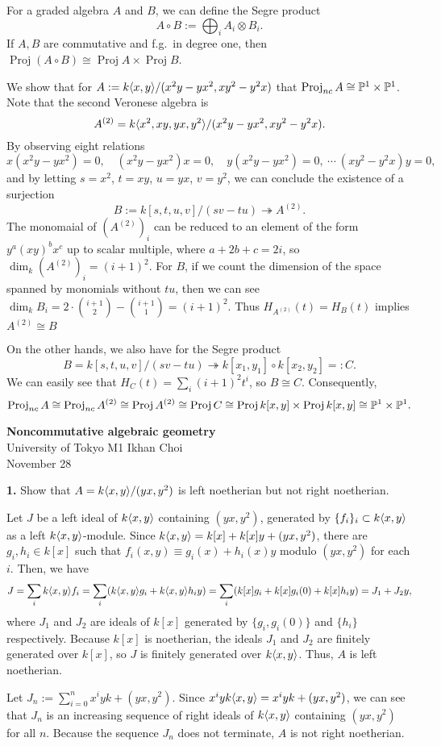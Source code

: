 \documentclass{../../../small}
\newcommand{\Proj}{\operatorname{Proj}}
\begin{document}
For a graded algebra $A$ and $B$, we can define the Segre product
\[A\circ B:=\bigoplus_iA_i\otimes B_i.\]
If $A,B$ are commutative and f.g.~in degree one, then $\Proj(A\circ B)\cong\Proj A\times\Proj B$.



\begin{ex}
We show that for $A:=k\langle x,y\rangle/(x^2y-yx^2,xy^2-y^2x)$ that $\Proj_{nc}A\cong\P^1\times\P^1$.
Note that the second Veronese algebra is
\[A^{(2)}=k\langle x^2,xy,yx,y^2\rangle/(x^2y-yx^2,xy^2-y^2x).\]
By observing eight relations
\[x(x^2y-yx^2)=0,\quad(x^2y-yx^2)x=0,\quad y(x^2y-yx^2)=0,\ \cdots\ (xy^2-y^2x)y=0,\]
and by letting $s=x^2$, $t=xy$, $u=yx$, $v=y^2$, we can conclude the existence of a surjection
\[B:=k[s,t,u,v]/(sv-tu)\twoheadrightarrow A^{(2)}.\]
The monomaial of $(A^{(2)})_i$ can be reduced to an element of the form $y^a(xy)^bx^c$ up to scalar multiple, where $a+2b+c=2i$, so $\dim_k(A^{(2)})_i=(i+1)^2$.
For $B$, if we count the dimension of the space spanned by monomials without $tu$, then we can see $\dim_kB_i=2\cdot{i+1\choose2}-{i+1\choose1}=(i+1)^2$.
Thus $H_{A^{(2)}}(t)=H_B(t)$ implies $A^{(2)}\cong B$

On the other hands, we also have for the Segre product
\[B=k[s,t,u,v]/(sv-tu)\twoheadrightarrow k[x_1,y_1]\circ k[x_2,y_2]=:C.\]
We can easily see that $H_C(t)=\sum_i(i+1)^2t^i$, so $B\cong C$.
Consequently,
\[\Proj_{nc}A\cong\Proj_{nc}A^{(2)}\cong\Proj A^{(2)}\cong\Proj C\cong\Proj k[x,y]\times\Proj k[x,y]\cong\P^1\times\P^1.\]
\end{ex}


\newpage
{}
\begin{center}
{\large\textbf{Noncommutative algebraic geometry}}\\
\bigskip
University of Tokyo M1 Ikhan Choi\\
November 28
\end{center}

\noindent
\textbf{1.}
Show that $A=k\langle x,y\rangle/(yx,y^2)$ is left noetherian but not right noetherian.
\begin{sol}
Let $J$ be a left ideal of $k\langle x,y\rangle$ containing $(yx,y^2)$, generated by $\{f_i\}_i\subset k\langle x,y\rangle$ as a left $k\langle x,y\rangle$-module.
Since $k\langle x,y\rangle=k[x]+k[x]y+(yx,y^2)$, there are $g_i,h_i\in k[x]$ such that $f_i(x,y)\equiv g_i(x)+h_i(x)y$ modulo $(yx,y^2)$ for each $i$.
Then, we have
\[J=\sum_ik\langle x,y\rangle f_i=\sum_i(k\langle x,y\rangle g_i+k\langle x,y\rangle h_iy)=\sum_i(k[x]g_i+k[x]g_i(0)+k[x]h_iy)=J_1+J_2y,\]
where $J_1$ and $J_2$ are ideals of $k[x]$ generated by $\{g_i,g_i(0)\}$ and $\{h_i\}$ respectively.
Because $k[x]$ is noetherian, the ideals $J_1$ and $J_2$ are finitely generated over $k[x]$, so $J$ is finitely generated over $k\langle x,y\rangle$.
Thus, $A$ is left noetherian.

Let $J_n:=\sum_{i=0}^nx^iyk+(yx,y^2)$.
Since $x^iyk\langle x,y\rangle=x^iyk+(yx,y^2)$, we can see that $J_n$ is an increasing sequence of right ideals of $k\langle x,y\rangle$ containing $(yx,y^2)$ for all $n$.
Because the sequence $J_n$ does not terminate, $A$ is not right noetherian.
\end{sol}
\end{document}
